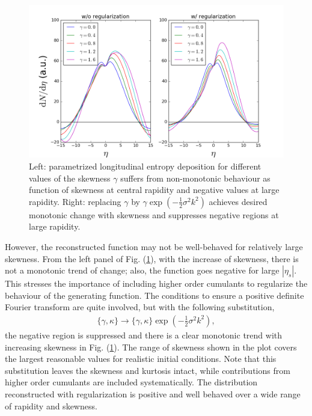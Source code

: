 \documentclass[aps,prl,twocolumn,groupedaddress]{revtex4-1}
\begin{document}
	\begin{figure}
	\begin{center}
	\includegraphics[width=\columnwidth]{pics/regulate.png}
	\caption{Left: parametrized longitudinal entropy deposition for different values of the skewness $\gamma$ suffers from non-monotonic behaviour as function of skewness at central rapidity and negative values at large rapidity. Right: replacing $\gamma$ by $\gamma\exp{\left(-\frac{1}{2}\sigma^2 k^2\right)}$ achieves desired monotonic change with skewness and suppresses negative regions at large rapidity.}\label{regulation}
	\end{center}
	\end{figure}
 
	However, the reconstructed function may not be well-behaved for relatively large skewness. 
	From the left panel of Fig. (\ref{regulation}), with the increase of skewness, there is not a monotonic trend of change; also, the function goes negative for large $|\eta_s|$.
	This stresses the importance of including higher order cumulants to regularize the behaviour of the generating function. 
	The conditions to ensure a positive definite Fourier transform are quite involved, but with the following substitution,
	\begin{eqnarray}
		\{\gamma, \kappa\} \rightarrow \{\gamma, \kappa\} \exp\left(-\frac{1}{2}\sigma^2k^2\right),
	\end{eqnarray}
	the negative region is suppressed and there is a clear monotonic trend with increasing skewness in Fig. (\ref{regulation}). The range of skewness shown in the plot covers the largest reasonable values for realistic initial conditions.	
	Note that this substitution leaves the skewness and kurtosis intact, while contributions from higher order cumulants are included systematically.
	The distribution reconstructed with regularization is positive and well behaved over a wide range of rapidity and skewness.
	
\end{document}
